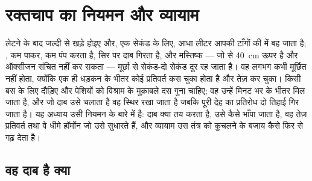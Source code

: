 \chapter{रक्तचाप का नियमन और व्यायाम}\label{ch:b2:blood-pressure}

लेटने के बाद जल्दी से खड़े होइए और, एक सेकंड के लिए, आधा लीटर
 आपकी टाँगों की  में बह जाता है; , कम पाकर,
कम पंप करता है, सिर पर दाब गिरता है, और मस्तिष्क --- जो
 से \qty{40}{cm} ऊपर है और ऑक्सीजन संचित नहीं कर सकता --- मूर्छा से
सेकंड-दो सेकंड दूर रह जाता है। वह लगभग कभी मूर्छित नहीं होता, क्योंकि एक ही धड़कन के भीतर
कोई प्रतिवर्त  कस चुका होता है और  तेज़ कर चुका। किसी बस के
लिए दौड़िए और पेशियों को विश्राम के मुक़ाबले दस गुना  चाहिए;
वह उन्हें मिनट भर के भीतर मिल जाता है, और जो दाब उसे चलाता है वह
स्थिर रखा जाता है जबकि पूरी देह का प्रतिरोध दो
तिहाई गिर जाता है। यह अध्याय उसी नियमन के बारे में है: दाब क्या
तय करता है, उसे कैसे भाँपा जाता है, वह तेज़ प्रतिवर्त तथा वे धीमे हॉर्मोन
जो उसे सुधारते हैं, और व्यायाम उस तंत्र को कुचलने के बजाय कैसे
फिर से गढ़ देता है।

\section{वह दाब है क्या}

